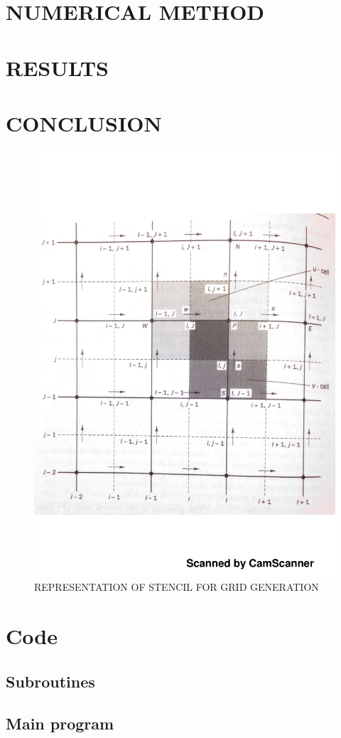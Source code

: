 \documentclass[cleanfoot,cleanhead,onecolumn,10pt,notitlepage]{asme2e}
\begin{document}

\section{NUMERICAL METHOD}





\section{RESULTS}



\section{CONCLUSION}




%
%



\begin{figure}[t]
\begin{center}
    \includegraphics[width=0.4\linewidth]{Stencil.pdf}
    \caption{REPRESENTATION OF STENCIL FOR GRID GENERATION}
    \label{fig:stencil}
\end{center}
\end{figure}

\clearpage

\appendix

\section{Code}

\subsection{Subroutines}

\subsection{Main program}

\end{document}
